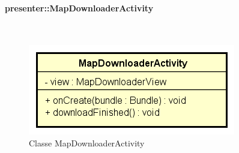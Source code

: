 \documentclass[../DefinizioneDiProdotto.tex]{subfiles}
\begin{document}
\paragraph{presenter::MapDownloaderActivity}
\
\begin{figure}[H]
	\centering
	\includegraphics[width=\maxwidth]{img/MapDownloaderActivity.png}
	\caption{Classe MapDownloaderActivity}\label{fig:presenter::MapDownloaderActivity} 
\end{figure}
\end{document}
